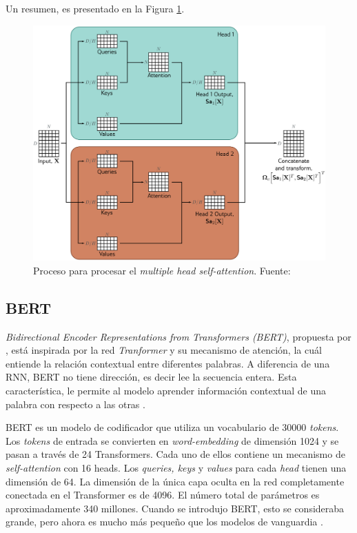 Un resumen, es presentado en la Figura \ref{fig:mhsa}.

\begin{figure}
	\centering
	\includegraphics[width=\textwidth]{../img/theory/mhsa}
	\caption{Proceso para procesar el \textit{multiple head self-attention}. Fuente: \cite{prince2023understanding}}
	\label{fig:mhsa}
\end{figure}


\subsection{BERT}

\textit{Bidirectional Encoder Representations from Transformers (BERT)}, propuesta por \cite{devlin2018bert}, está inspirada por la red \textit{Tranformer} y su mecanismo de atención, la cuál entiende la relación contextual entre diferentes palabras. A diferencia de una RNN, BERT no tiene dirección, es decir lee la secuencia entera. Esta característica, le permite al modelo aprender información contextual de una palabra con respecto a las otras \citep{Kelvin_transformer2022}.


BERT es un modelo de codificador que utiliza un vocabulario de 30000 \textit{tokens}. Los \textit{tokens} de entrada se convierten en \textit{word-embedding} de dimensión 1024 y se pasan a través de 24 Transformers. Cada uno de ellos contiene un mecanismo de \textit{self-attention} con 16 heads. Los \textit{queries, keys} y \textit{values} para cada \textit{head} tienen una dimensión de 64. La dimensión de la única capa oculta en la red completamente conectada en el Transformer es de 4096. El número total de parámetros es aproximadamente 340 millones. Cuando se introdujo BERT, esto se consideraba grande, pero ahora es mucho más pequeño que los modelos de vanguardia \citep{prince2023understanding}.


